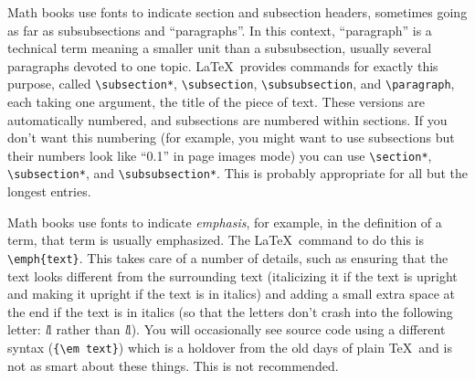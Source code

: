 Math books use fonts to indicate section and subsection headers, sometimes going as far as subsubsections and ``paragraphs''. In this context, ``paragraph'' is a technical term meaning a smaller unit than a subsubsection, usually several paragraphs devoted to one topic. \LaTeX\ provides commands for exactly this purpose, called \verb|\subsection*|, \verb|\subsection|, \verb|\subsubsection|, and \verb|\paragraph|, each taking one argument, the title of the piece of text. These versions are automatically numbered, and subsections are numbered within sections. If you don't want this numbering (for example, you might want to use subsections but their numbers look like ``0.1'' in page images mode) you can use \verb|\section*|, \verb|\subsection*|, and \verb|\subsubsection*|. This is probably appropriate for all but the longest entries.

Math books use fonts to indicate \emph{emphasis}, for example, in the definition of a term, that term is usually emphasized. The \LaTeX\ command to do this is \verb|\emph{text}|. This takes care of a number of details, such as ensuring that the text looks different from the surrounding text (italicizing it if the text is upright and making it upright if the text is in italics) and adding a small extra space at the end if the text is in italics (so that the letters don't crash into the following letter: \emph{l}l rather than {\em l}l). You will occasionally see source code using a different syntax (\verb|{\em text}|) which is a holdover from the old days of plain \TeX\ and is not as smart about these things. This is not recommended.

